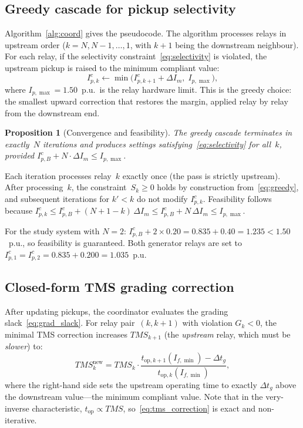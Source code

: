 \documentclass[journal,twoside,letterpaper]{IEEEtran}
\newtheorem{proposition}{Proposition}
\begin{document}
\subsection{Greedy cascade for pickup selectivity}

Algorithm~\ref{alg:coord} gives the pseudocode.
The algorithm processes relays in upstream order
($k = N, N-1, \dots, 1$, with $k+1$ being the downstream
neighbour).
For each relay, if the selectivity constraint~\eqref{eq:selectivity}
is violated, the upstream pickup is raised to the minimum
compliant value:
\begin{equation}
  I_{p,k}^c \leftarrow
    \min\!\bigl(I_{p,k+1}^c + \Delta I_m,\;I_{p,\max}\bigr),
\label{eq:greedy}
\end{equation}
where $I_{p,\max} = 1.50$~p.u.\ is the relay hardware limit.
This is the greedy choice: the smallest upward correction
that restores the margin, applied relay by relay from the
downstream end.

\begin{proposition}[Convergence and feasibility]
\label{prop:convergence}
The greedy cascade terminates in exactly~$N$ iterations
and produces settings satisfying~\eqref{eq:selectivity}
for all~$k$, provided
$I_{p,B}^c + N \cdot \Delta I_m \leq I_{p,\max}$.
\end{proposition}

\begin{IEEEproof}
Each iteration processes relay~$k$ exactly once
(the pass is strictly upstream).
After processing~$k$, the constraint~$S_k \geq 0$ holds
by construction from~\eqref{eq:greedy}, and subsequent
iterations for $k' < k$ do not modify $I_{p,k}^c$.
Feasibility follows because
$I_{p,k}^c \leq I_{p,B}^c + (N+1-k)\,\Delta I_m
           \leq I_{p,B}^c + N\,\Delta I_m \leq I_{p,\max}$.
\end{IEEEproof}

For the study system with $N=2$:
$I_{p,B}^c + 2 \times 0.20 = 0.835 + 0.40 = 1.235 < 1.50$~p.u.,
so feasibility is guaranteed.
Both generator relays are set to
$I_{p,1}^c = I_{p,2}^c = 0.835 + 0.200 = 1.035$~p.u.

\subsection{Closed-form TMS grading correction}

After updating pickups, the coordinator evaluates the
grading slack~\eqref{eq:grad_slack}.
For relay pair~$(k, k+1)$ with violation $G_k < 0$, the
minimal TMS correction increases $TMS_{k+1}$ (the
\emph{upstream} relay, which must be \emph{slower}) to:
\begin{equation}
  TMS_k^{\mathrm{new}} = TMS_k \cdot
    \frac{t_{\mathrm{op},k+1}(I_{f,\min}) - \Delta t_g}{t_{\mathrm{op},k}(I_{f,\min})},
\label{eq:tms_correction}
\end{equation}
where the right-hand side sets the upstream operating time
to exactly $\Delta t_g$ above the downstream value---the
minimum compliant value.
Note that in the very-inverse characteristic,
$t_{\mathrm{op}} \propto TMS$, so~\eqref{eq:tms_correction}
is exact and non-iterative.
\end{document}
